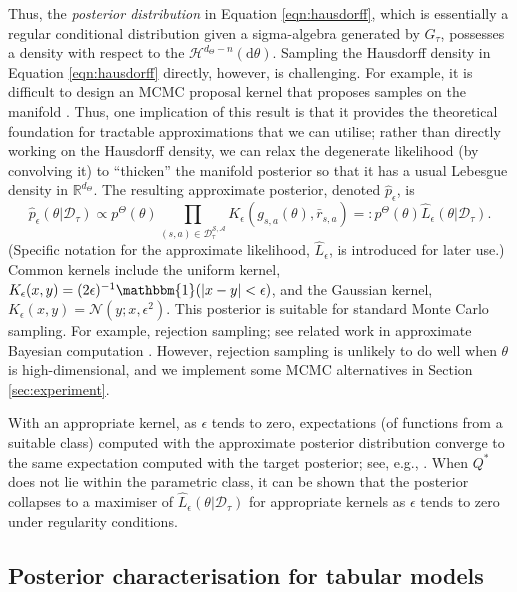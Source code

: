\documentclass{amsart}
\newcommand{\pabc}{\hat{p}_{\epsilon}}
\begin{document}
Thus, the \textit{posterior distribution} in Equation \ref{eqn:hausdorff}, which is essentially a regular conditional distribution given a sigma-algebra generated by $G_\tau$, possesses a density with respect to the  $\mathcal{H}^{d_\Theta-n}(\mathrm{d} \theta)$. Sampling the Hausdorff density in Equation \ref{eqn:hausdorff} directly, however, is challenging. For example, it is difficult to design an MCMC proposal kernel that proposes samples on the manifold \citep{manifoldlifting}. Thus, one implication of this result is that it provides the theoretical foundation for tractable approximations that we can utilise; rather than directly working on the Hausdorff density, we can relax the degenerate likelihood (by convolving it) to ``thicken'' the manifold posterior so that it has a usual Lebesgue density in $\mathbb{R}^{d_\Theta}$. The resulting approximate posterior, denoted $\hat{p}_\epsilon$, is
\begin{equation}\label{eqn:abcpos}
    \pabc(\theta|\mathcal{D}_\tau) \propto  p^\Theta(\theta) \prod_{(s,a) \in \mathcal{D}_\tau^{\mathcal{S},\mathcal{A}}} K_\epsilon(g_{s,a}(\theta),\bar{r}_{s,a}) =: p^\Theta(\theta) \hat{L}_\epsilon(\theta|\mathcal{D}_\tau).
\end{equation}
(Specific notation for the approximate likelihood, $\hat{L}_\epsilon$, is introduced for later use.) Common kernels include the uniform kernel, $K_\epsilon(x,y) = (2\epsilon)^{-1} \mathbbm{1}(|x-y|<\epsilon)$, and the Gaussian kernel, $K_\epsilon(x,y) = \mathcal{N}(y;x,\epsilon^2)$. This posterior is suitable for standard Monte Carlo sampling. For example, rejection sampling; see related work in approximate Bayesian computation \citep{abcwikinson,abcmarin}. However, rejection sampling is unlikely to do well when $\theta$ is high-dimensional, and we implement some MCMC alternatives in Section \ref{sec:experiment}.

With an appropriate kernel, as $\epsilon$ tends to zero, expectations (of functions from a suitable class) computed with the approximate posterior distribution converge to the same expectation computed with the target posterior; see, e.g., \citet{manifoldsampling_phdthesis}. When $Q^*$ does not lie within the parametric class, it can be shown that the posterior collapses to a maximiser of $\hat{L}_\epsilon(\theta|\mathcal{D}_\tau)$ for appropriate kernels as $\epsilon$ tends to zero under regularity conditions.


\subsection{Posterior characterisation for tabular models}\label{sec:tabhausdorff}
\end{document}
